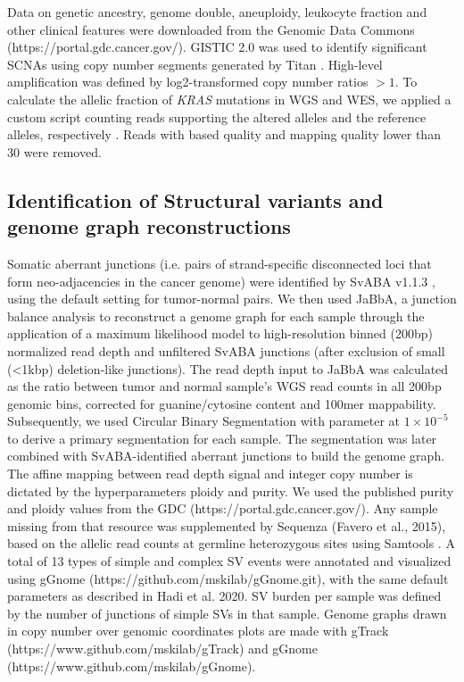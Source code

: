 \documentclass[phd,tocprelim]{cornell}
\begin{document}
Data on genetic ancestry, genome double, aneuploidy, leukocyte fraction and other clinical features were downloaded from the Genomic Data Commons (https://portal.gdc.cancer.gov/). GISTIC 2.0 \cite{Mermel2011-gt} was used to identify significant SCNAs using copy number segments generated by Titan \cite{Ha2014-ai}. High-level amplification was defined by log2-transformed copy number ratios $>1$. To calculate the allelic fraction of \textit{KRAS} mutations in WGS and WES, we applied a custom script counting reads supporting the altered alleles and the reference alleles, respectively \cite{Carrot-Zhang2017-lo}. Reads with based quality and mapping quality lower than 30 were removed.

\subsection*{Identification of Structural variants and genome graph reconstructions}
Somatic aberrant junctions (i.e. pairs of strand-specific disconnected loci that form neo-adjacencies in the cancer genome) were identified by SvABA v1.1.3 \cite{Wala2018-qa}, using the default setting for tumor-normal pairs. We then used JaBbA, a junction balance analysis \cite{Hadi2020-um} to reconstruct a genome graph for each sample through the application of a maximum likelihood model to high-resolution binned (200bp) normalized read depth and unfiltered SvABA junctions (after exclusion of small (<1kbp) deletion-like junctions). The read depth input to JaBbA was calculated as the ratio between tumor and normal sample’s WGS read counts in all 200bp genomic bins, corrected for guanine/cytosine content and 100mer mappability. Subsequently, we used Circular Binary Segmentation \cite{Olshen2004-cl} with \textalpha parameter at $1 \times 10^{-5}$ to derive a primary segmentation for each sample. The segmentation was later combined with SvABA-identified aberrant junctions to build the genome graph. The affine mapping between read depth signal and integer copy number is dictated by the hyperparameters ploidy and purity. We used the published purity and ploidy values from the GDC (https://portal.gdc.cancer.gov/). Any sample missing from that resource was supplemented by Sequenza (Favero et al., 2015), based on the allelic read counts at germline heterozygous sites using Samtools \cite{Li2009-uz}. A total of 13 types of simple and complex SV events were annotated and visualized using gGnome (https://github.com/mskilab/gGnome.git), with the same default parameters as described in Hadi et al. 2020. SV burden per sample was defined by the number of junctions of simple SVs in that sample. Genome graphs drawn in copy number over genomic coordinates plots are made with gTrack (https://www.github.com/mskilab/gTrack) and gGnome (https://www.github.com/mskilab/gGnome).
\end{document}
